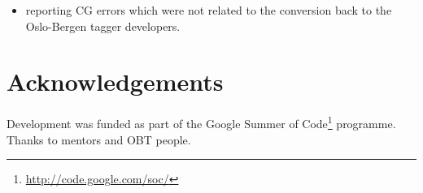 \documentclass[11pt]{article}
\begin{document}
\begin{itemize} \item reporting CG errors which were not
  related
  to the conversion back to the Oslo-Bergen tagger developers.
\end{itemize} 

\section*{Acknowledgements}

Development was funded as part of the Google Summer of
Code\footnote{\href{http://code.google.com/soc/}{http://code.google.com/soc/}
} programme. Thanks to mentors and OBT people.




\end{document}
